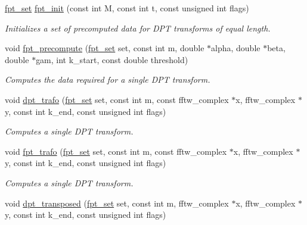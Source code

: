 \begin{CompactItemize}
\item 
\hyperlink{group__fpt_g73d630ac21d6474ba0693f124d465e15}{fpt\_\-set} \hyperlink{group__fpt_gd103ad18c75ee5dd048392dfd1ca7305}{fpt\_\-init} (const int M, const int t, const unsigned int flags)
\begin{CompactList}\small\item\em Initializes a set of precomputed data for DPT transforms of equal length. \item\end{CompactList}\item 
void \hyperlink{group__fpt_gd3c3b30fda57364c92958cc7390b6378}{fpt\_\-precompute} (\hyperlink{group__fpt_g73d630ac21d6474ba0693f124d465e15}{fpt\_\-set} set, const int m, double $\ast$alpha, double $\ast$beta, double $\ast$gam, int k\_\-start, const double threshold)
\begin{CompactList}\small\item\em Computes the data required for a single DPT transform. \item\end{CompactList}\item 
void \hyperlink{group__fpt_g213c59e560060e8b2f16958cda5f2bdb}{dpt\_\-trafo} (\hyperlink{group__fpt_g73d630ac21d6474ba0693f124d465e15}{fpt\_\-set} set, const int m, const fftw\_\-complex $\ast$x, fftw\_\-complex $\ast$y, const int k\_\-end, const unsigned int flags)
\begin{CompactList}\small\item\em Computes a single DPT transform. \item\end{CompactList}\item 
void \hyperlink{group__fpt_g16d416e80a919ac119d5cea13fce79d0}{fpt\_\-trafo} (\hyperlink{group__fpt_g73d630ac21d6474ba0693f124d465e15}{fpt\_\-set} set, const int m, const fftw\_\-complex $\ast$x, fftw\_\-complex $\ast$y, const int k\_\-end, const unsigned int flags)
\begin{CompactList}\small\item\em Computes a single DPT transform. \item\end{CompactList}\item 
void \hyperlink{group__fpt_g6681dc8303d72562d459a25b87deb357}{dpt\_\-transposed} (\hyperlink{group__fpt_g73d630ac21d6474ba0693f124d465e15}{fpt\_\-set} set, const int m, fftw\_\-complex $\ast$x, fftw\_\-complex $\ast$y, const int k\_\-end, const unsigned int flags)

\end{CompactItemize}
